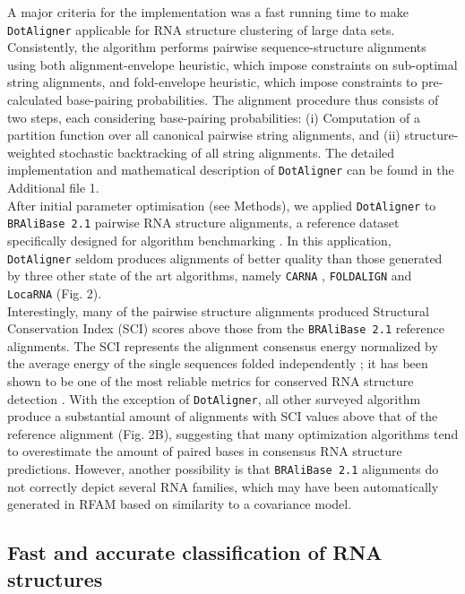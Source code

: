 \documentclass{bmcart}
\newcommand\dotaligner{\texttt{DotAligner}}
\newcommand\bralibase{\texttt{BRAliBase 2.1}}
\newcommand\locarna{\texttt{LocaRNA}}
\newcommand\foldalign{\texttt{FOLDALIGN}}
\newcommand\carna{\texttt{CARNA}}
\begin{document}
A major criteria for the implementation was a fast running time to make
\dotaligner{} applicable for RNA structure clustering of large data sets.
Consistently, the algorithm performs pairwise sequence-structure alignments
using both alignment-envelope heuristic, which impose constraints on
sub-optimal string alignments, and fold-envelope heuristic, which impose
constraints to pre-calculated base-pairing probabilities.  The alignment
procedure thus consists of two steps, each considering base-pairing
probabilities: (i) Computation of a partition function over all canonical
pairwise string alignments, and (ii) structure-weighted stochastic backtracking
of all string alignments. The detailed implementation and mathematical
description of \dotaligner{} can be found in the Additional file 1.\\

After initial parameter optimisation (see Methods), we applied 
\dotaligner{} to \bralibase{} pairwise RNA structure alignments, a reference 
dataset specifically designed for algorithm benchmarking 
\cite{Gardner15860779,wilm2006enhanced}. In this application, \dotaligner{} seldom 
produces alignments of better quality than those generated by three other 
state of the art algorithms, namely \carna{} \cite{Sorescu2012}, \foldalign{} 
\cite{havgaard2007fast,sundfeld2015foldalign} and \locarna{} \cite{Will17432929}
(Fig. 2).\\

Interestingly, many of the pairwise structure alignments produced Structural
Conservation Index (SCI) scores above those from the \bralibase{} reference
alignments. The SCI represents the alignment consensus energy normalized by the
average energy of the single sequences folded independently
\cite{washietl2005fast}; it has been shown to be one of the most reliable
metrics for conserved RNA structure detection \cite{gruber2008strategies}. With
the exception of \dotaligner{}, all other surveyed algorithm produce a
substantial amount of alignments with SCI values above that of the reference
alignment (Fig. 2B), suggesting that many optimization algorithms tend to
overestimate the amount of paired bases in consensus RNA structure predictions.
However, another possibility is that \bralibase{} alignments do not correctly
depict several RNA families, which may have been automatically generated in
RFAM based on similarity to a covariance model.\\

\subsection*{Fast and accurate classification of RNA structures} 
\end{document}
